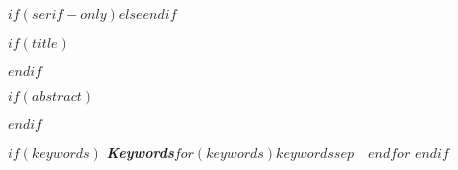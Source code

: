 $if(serif-only)$$else$\allsectionsfont{\sffamily}$endif$

$if(title)$
\maketitle
$endif$

$if(abstract)$
\begin{abstract}
$abstract$
\end{abstract}
$endif$

$if(keywords)$
\textbf{\textit{Keywords}}\quad $for(keywords)$$keywords$$sep$~\textbullet~$endfor$
$endif$
